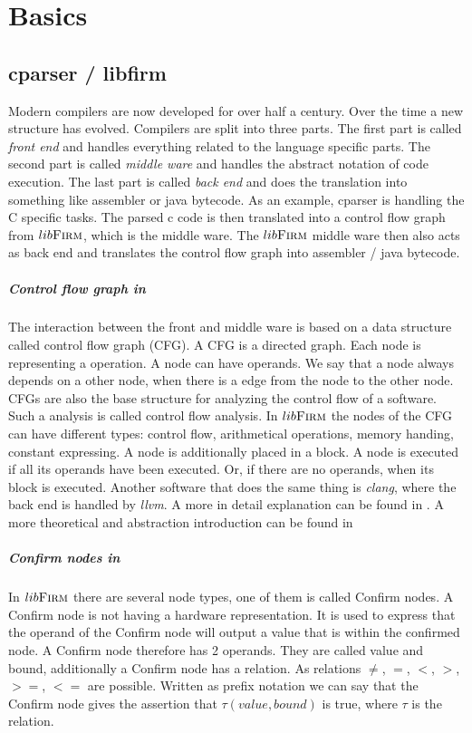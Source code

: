 \chapter{Basics}\label{sec:basics}

\section{cparser / libfirm}
Modern compilers are now developed for over half a century. Over the time a new structure has evolved. Compilers are split into three parts. The first part is called \textit{front end} and handles everything related to the language specific parts. The second part is called \textit{middle ware} and handles the abstract notation of code execution. The last part is called \textit{back end} and does the translation into something like assembler or java bytecode. As an example, cparser is handling the C specific tasks. The parsed c code is then translated into a control flow graph from $lib\textsc{Firm}$, which is the middle ware. The $lib\textsc{Firm}$ middle ware then also acts as back end and translates the control flow graph into assembler / java bytecode.

\paragraph{Control flow graph in \libFIRM} The interaction between the front and middle ware is based on a data structure called control flow graph (CFG). A CFG is a directed graph. Each node is representing a operation. A node can have operands. We say that a node always depends on a other node, when there is a edge from the node to the other node. CFGs are also the base structure for analyzing the control flow of a software. Such a analysis is called control flow analysis. In $lib\textsc{Firm}$ the nodes of the CFG can have different types: control flow, arithmetical operations, memory handing, constant expressing. A node is additionally placed in a block. A node is executed if all its operands have been executed. Or, if there are no operands, when its block is executed.
Another software that does the same thing is \textit{clang}, where the back end is handled by \textit{llvm}.
A more in detail explanation can be found in \cite{libfirm}. A more theoretical and abstraction introduction can be found in \cite{control-flow-analysis}

\paragraph{Confirm nodes in \libFIRM}
In $lib\textsc{Firm}$ there are several node types, one of them is called Confirm nodes. A Confirm node is not having a hardware representation. It is used to express that the operand of the Confirm node will output a value that is within the confirmed node. A Confirm node therefore has 2 operands. They are called value and bound, additionally a Confirm node has a relation.
As relations $\not=$, $=$, $<$, $>$, $>=$, $<=$ are possible. 
Written as prefix notation we can say that the Confirm node gives the assertion that $\tau(value, bound)$ is true, where $\tau$ is the relation.


